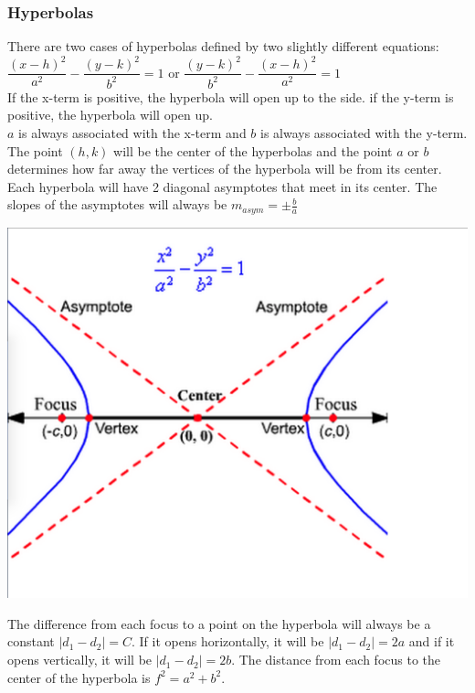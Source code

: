 \subsubsection{Hyperbolas}
There are two cases of hyperbolas defined by two slightly different equations: $\dfrac{(x-h)^2}{a^2}-\dfrac{(y-k)^2}{b^2}=1$ or $\dfrac{(y-k)^2}{b^2}-\dfrac{(x-h)^2}{a^2}=1$\\
If the x-term is positive, the hyperbola will open up to the side. if the y-term is positive, the hyperbola will open up.\\
$a$ is always associated with the x-term and $b$ is always associated with the y-term.\\
The point $(h,k)$ will be the center of the hyperbolas and the point $a$ or $b$ determines how far away the vertices of the hyperbola will be from its center. Each hyperbola will have 2 diagonal asymptotes that meet in its center. The slopes of the asymptotes will always be $m_{asym}=\pm\frac{b}{a}$\\
\centerline{\includegraphics[scale=0.3]{PreCalcPictures/HyperbolaGraph.png}}
The difference from each focus to a point on the hyperbola will always be a constant $|d_1-d_2|=C$. If it opens horizontally, it will be $|d_1-d_2|=2a$ and if it opens vertically, it will be $|d_1-d_2|=2b$. The distance from each focus to the center of the hyperbola is $f^2=a^2+b^2$.